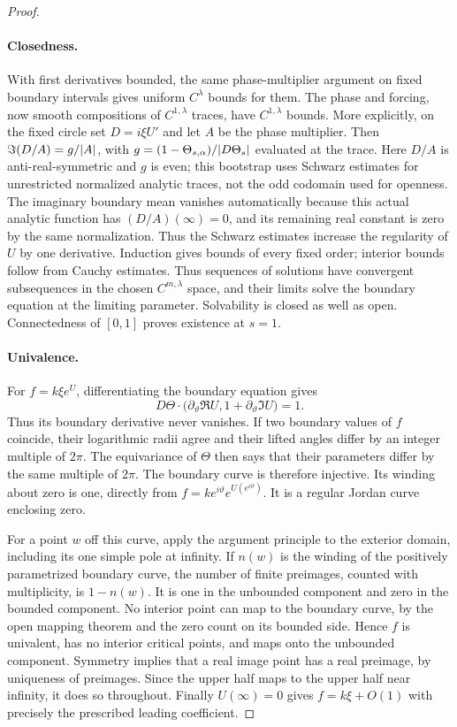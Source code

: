 \begin{proof}
\paragraph{Closedness.}
With first derivatives bounded, the same phase-multiplier argument on
fixed boundary intervals gives uniform $C^\lambda$ bounds for them.
The phase and forcing, now smooth compositions of $C^{1,\lambda}$
traces, have $C^{1,\lambda}$ bounds.  More explicitly, on the fixed
circle set $D=i\xi U'$ and let $A$ be the phase multiplier.  Then
$\Im(D/A)=g/\lvert A\rvert$, with
$g=(1-\Theta_{s,\alpha})/\lvert D\Theta_s\rvert$ evaluated at the trace.
Here $D/A$ is anti-real-symmetric and $g$ is even; this bootstrap
uses Schwarz estimates for unrestricted normalized analytic traces,
not the odd codomain used for openness.  The imaginary boundary mean
vanishes automatically because this actual analytic function has
$(D/A)(\infty)=0$, and its remaining real constant is zero by the same
normalization.  Thus the Schwarz estimates increase the regularity of
$U$ by one derivative.  Induction gives bounds of every fixed order;
interior bounds follow from Cauchy estimates.  Thus sequences of solutions have convergent subsequences
in the chosen $C^{m,\lambda}$ space, and their limits solve the boundary
equation at the limiting parameter.  Solvability is closed as well as
open.  Connectedness of $[0,1]$ proves existence at $s=1$.

\paragraph{Univalence.}
For $f=k\xi e^U$, differentiating the boundary equation gives
\[
 D\Theta\cdot
 \bigl(\partial_\vartheta\Re U,
                  1+\partial_\vartheta\Im U\bigr)=1.
\]
Thus its boundary derivative never vanishes.  If two boundary values
of $f$ coincide, their logarithmic radii agree and their lifted angles
differ by an integer multiple of $2\pi$.  The equivariance of $\Theta$
then says that their parameters differ by the same multiple of $2\pi$.
The boundary curve is therefore injective.  Its winding about zero
is one, directly from $f=k e^{i\vartheta}e^{U(e^{i\vartheta})}$.
It is a regular Jordan curve enclosing zero.

For a point $w$ off this curve, apply the argument principle to the
exterior domain, including its one simple pole at infinity.  If
$n(w)$ is the winding of the positively parametrized boundary curve,
the number of finite preimages, counted with multiplicity, is
$1-n(w)$.  It is one in the unbounded component and zero in the bounded
component.  No interior point can map to the boundary curve, by the
open mapping theorem and the zero count on its bounded side.  Hence
$f$ is univalent, has no interior critical points, and maps onto the
unbounded component.  Symmetry implies that a real image point has a
real preimage, by uniqueness of preimages.  Since the upper half maps
to the upper half near infinity, it does so throughout.  Finally
$U(\infty)=0$ gives $f=k\xi+O(1)$ with precisely the prescribed leading
coefficient.
\end{proof}

